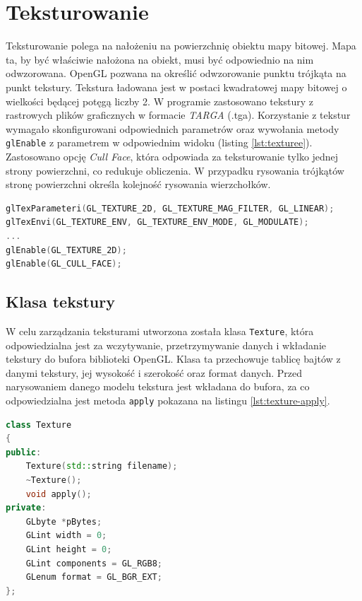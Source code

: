 \newpage
\section{Teksturowanie}
Teksturowanie polega na nałożeniu na powierzchnię obiektu mapy bitowej. Mapa ta, by być właściwie nałożona na obiekt, musi być odpowiednio na nim odwzorowana. OpenGL pozwana na określić odwzorowanie punktu trójkąta na punkt tekstury. Tekstura ładowana jest w postaci kwadratowej mapy bitowej o wielkości będącej potęgą liczby 2. W programie zastosowano tekstury z rastrowych plików graficznych w formacie \textit{TARGA} (.tga). 
Korzystanie z tekstur wymagało skonfigurowani odpowiednich parametrów oraz wywołania metody \lstinline{glEnable} z parametrem w odpowiednim widoku (listing \ref{lst:texturee}). Zastosowano opcję \textit{Cull Face}, która odpowiada za teksturowanie tylko jednej strony powierzchni, co redukuje obliczenia. W przypadku rysowania trójkątów stronę powierzchni określa kolejność rysowania wierzchołków.

\begin{lstlisting}[language=C++, caption=Konfiguracja ustawień teksturowania., label={lst:texturee}]
glTexParameteri(GL_TEXTURE_2D, GL_TEXTURE_MAG_FILTER, GL_LINEAR);
glTexEnvi(GL_TEXTURE_ENV, GL_TEXTURE_ENV_MODE, GL_MODULATE);
...
glEnable(GL_TEXTURE_2D);
glEnable(GL_CULL_FACE);
\end{lstlisting}

\subsection{Klasa tekstury}
W celu zarządzania teksturami utworzona została klasa \lstinline{Texture}, która odpowiedzialna jest za wczytywanie, przetrzymywanie danych i wkładanie tekstury do bufora biblioteki OpenGL. Klasa ta przechowuje tablicę bajtów z danymi tekstury, jej wysokość i szerokość oraz format danych.
Przed narysowaniem danego modelu tekstura jest wkładana do bufora, za co odpowiedzialna jest metoda \lstinline{apply} pokazana na listingu \ref{lst:texture-apply}.
\clearpage
\begin{lstlisting}[language=C++, caption=Definicja klasy \lstinline{Texture}., label={lst:texture}]
class Texture
{
public:
    Texture(std::string filename);
    ~Texture();
    void apply();
private:
    GLbyte *pBytes;
    GLint width = 0;
    GLint height = 0;
    GLint components = GL_RGB8;
    GLenum format = GL_BGR_EXT;
};
\end{lstlisting}


